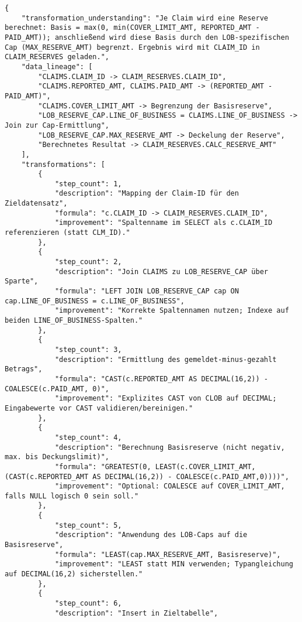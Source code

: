 \begin{lstlisting}[caption={Ausgabe: GPT-5 Anwendungsfall 10 Konsistenzdurchlauf},label={gpt_case10_prompt2}]
{
    "transformation_understanding": "Je Claim wird eine Reserve berechnet: Basis = max(0, min(COVER_LIMIT_AMT, REPORTED_AMT - PAID_AMT)); anschließend wird diese Basis durch den LOB-spezifischen Cap (MAX_RESERVE_AMT) begrenzt. Ergebnis wird mit CLAIM_ID in CLAIM_RESERVES geladen.",
    "data_lineage": [
        "CLAIMS.CLAIM_ID -> CLAIM_RESERVES.CLAIM_ID",
        "CLAIMS.REPORTED_AMT, CLAIMS.PAID_AMT -> (REPORTED_AMT - PAID_AMT)",
        "CLAIMS.COVER_LIMIT_AMT -> Begrenzung der Basisreserve",
        "LOB_RESERVE_CAP.LINE_OF_BUSINESS = CLAIMS.LINE_OF_BUSINESS -> Join zur Cap-Ermittlung",
        "LOB_RESERVE_CAP.MAX_RESERVE_AMT -> Deckelung der Reserve",
        "Berechnetes Resultat -> CLAIM_RESERVES.CALC_RESERVE_AMT"
    ],
    "transformations": [
        {
            "step_count": 1,
            "description": "Mapping der Claim-ID für den Zieldatensatz",
            "formula": "c.CLAIM_ID -> CLAIM_RESERVES.CLAIM_ID",
            "improvement": "Spaltenname im SELECT als c.CLAIM_ID referenzieren (statt CLM_ID)."
        },
        {
            "step_count": 2,
            "description": "Join CLAIMS zu LOB_RESERVE_CAP über Sparte",
            "formula": "LEFT JOIN LOB_RESERVE_CAP cap ON cap.LINE_OF_BUSINESS = c.LINE_OF_BUSINESS",
            "improvement": "Korrekte Spaltennamen nutzen; Indexe auf beiden LINE_OF_BUSINESS-Spalten."
        },
        {
            "step_count": 3,
            "description": "Ermittlung des gemeldet-minus-gezahlt Betrags",
            "formula": "CAST(c.REPORTED_AMT AS DECIMAL(16,2)) - COALESCE(c.PAID_AMT, 0)",
            "improvement": "Explizites CAST von CLOB auf DECIMAL; Eingabewerte vor CAST validieren/bereinigen."
        },
        {
            "step_count": 4,
            "description": "Berechnung Basisreserve (nicht negativ, max. bis Deckungslimit)",
            "formula": "GREATEST(0, LEAST(c.COVER_LIMIT_AMT, (CAST(c.REPORTED_AMT AS DECIMAL(16,2)) - COALESCE(c.PAID_AMT,0))))",
            "improvement": "Optional: COALESCE auf COVER_LIMIT_AMT, falls NULL logisch 0 sein soll."
        },
        {
            "step_count": 5,
            "description": "Anwendung des LOB-Caps auf die Basisreserve",
            "formula": "LEAST(cap.MAX_RESERVE_AMT, Basisreserve)",
            "improvement": "LEAST statt MIN verwenden; Typangleichung auf DECIMAL(16,2) sicherstellen."
        },
        {
            "step_count": 6,
            "description": "Insert in Zieltabelle",

\end{lstlisting}
